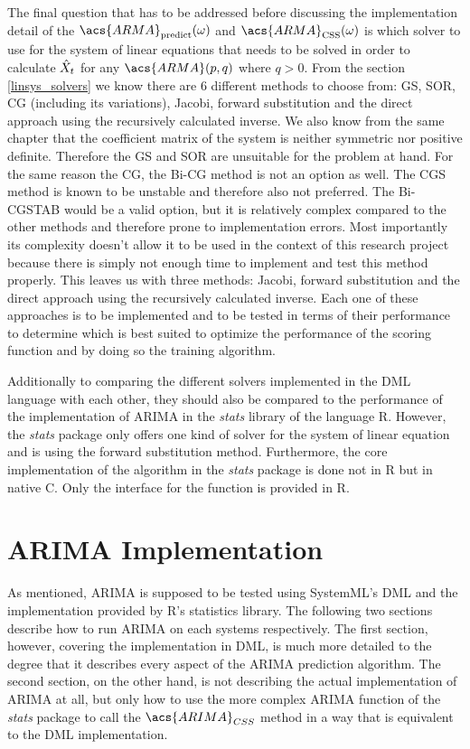 The final question that has to be addressed before discussing the implementation detail of the $\acs{ARMA}_{\textrm{predict}}(\omega)$ and $\acs{ARMA}_{\textrm{CSS}}(\omega)$ is which solver to use for the system of linear equations that needs to be solved in order to calculate $\Hat{X}_t$ for any $\acs{ARMA}(p,q)$ where $q > 0$. From the section \ref{linsys_solvers} we know there are 6 different methods to choose from: \acl{GS}, \acl{SOR}, \acl{CG} (including its variations), Jacobi, forward substitution and the direct approach using the recursively calculated inverse. We also know from the same chapter that the coefficient matrix of the system is neither symmetric nor positive definite. Therefore the \acl{GS} and  \acl{SOR} are unsuitable for the problem at hand. For the same reason the \acl{CG}, the \acl{Bi-CG} method is not an option as well. The \acl{CGS} method is known to be unstable and therefore also not preferred. The \acl{Bi-CGSTAB} would be a valid option, but it is relatively complex compared to the other methods and therefore prone to implementation errors. Most importantly its complexity doesn't allow it to be used in the context of this research project because there is simply not enough time to implement and test this method properly. This leaves us with three methods: Jacobi, forward substitution and the direct approach using the recursively calculated inverse. Each one of these approaches is to be implemented and to be tested in terms of their performance to determine which is best suited to optimize the performance of the scoring function and by doing so the training algorithm.

Additionally to comparing the different solvers implemented in the \acs{DML} language with each other, they should also be compared to the performance of the implementation of \acs{ARIMA} in the \textit{stats} library of the language R. However, the \textit{stats} package only offers one kind of solver for the system of linear equation and is using the forward substitution method. Furthermore, the core implementation of the algorithm in the \textit{stats} package is done not in R but in native C. Only the interface for the function is provided in R.

\section{ARIMA Implementation}

As mentioned, \acs{ARIMA} is supposed to be tested using SystemML's \acl{DML} and the implementation provided by R's statistics library. The following two sections describe how to run \acs{ARIMA} on each systems respectively. The first section, however, covering the implementation in \ac{DML}, is much more detailed to the degree that it describes every aspect of the \acs{ARIMA} prediction algorithm. The second section, on the other hand, is not describing the actual implementation of \acs{ARIMA} at all, but only how to use the more complex \acs{ARIMA} function of the \textit{stats} package to call the $\acs{ARIMA}_{CSS}$ method in a way that is equivalent to the \acs{DML} implementation. 

